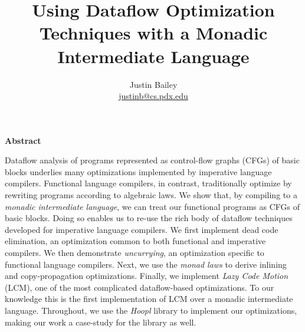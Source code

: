 \documentclass[12pt]{article}
\begin{document}


\newcommand{\authorEmail}{\url{justinb@cs.pdx.edu}}

\date{}
\author{Justin Bailey \\ \authorEmail}
\title{Using Dataflow Optimization Techniques with a Monadic Intermediate Language}
\maketitle 
\thispagestyle{empty}
\newpage
{}
\thispagestyle{plain}


\begin{center}
  \newlength{\abstractLen}
  \begin{minipage}{\abstractLen}
    \begin{center}
      {\sffamily\bfseries Abstract}
    \end{center}
    \bigskip
    \noindent
    Dataflow analysis of programs represented as control-flow graphs
    (CFGs) of basic blocks underlies many optimizations implemented by
    imperative language compilers. Functional language compilers, in
    contrast, traditionally optimize by rewriting programs according to
    algebraic laws. We show that, by compiling to a \emph{monadic
      intermediate language}, we can treat our functional programs as
    CFGs of basic blocks. Doing so enables us to re-use the rich body of
    dataflow techniques developed for imperative language compilers. We
    first implement dead code elimination, an optimization common to
    both functional and imperative compilers. We then demonstrate
    \emph{uncurrying}, an optimization specific to functional language
    compilers. Next, we use the \emph{monad laws} to derive inlining and
    copy-propagation optimizations. Finally, we implement \emph{Lazy
      Code Motion} (LCM), one of the most complicated dataflow-based
    optimizations. To our knowledge this is the first implementation of
    LCM over a monadic intermediate language. Throughout, we use the
    \emph{Hoopl} library to implement our optimizations, making our work
    a case-study for the library as well.
  \end{minipage}
\end{center}

\end{document}
